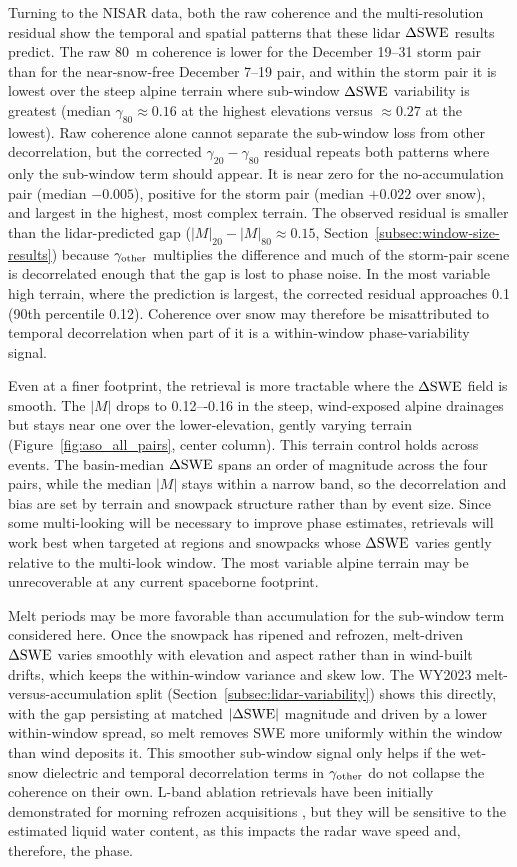 \documentclass[journal abbreviation, manuscript]{copernicus}
\begin{document}
Turning to the NISAR data, both the raw coherence and the multi-resolution residual show the temporal and spatial patterns that these lidar $\Delta\mathrm{SWE}$ results predict. The raw 80~m coherence is lower for the December 19--31 storm pair than for the near-snow-free December 7--19 pair, and within the storm pair it is lowest over the steep alpine terrain where sub-window $\Delta\mathrm{SWE}$ variability is greatest (median $\gamma_{80}\approx0.16$ at the highest elevations versus $\approx0.27$ at the lowest). Raw coherence alone cannot separate the sub-window loss from other decorrelation, but the corrected $\gamma_{20}-\gamma_{80}$ residual repeats both patterns where only the sub-window term should appear. It is near zero for the no-accumulation pair (median $-0.005$), positive for the storm pair (median $+0.022$ over snow), and largest in the highest, most complex terrain. The observed residual is smaller than the lidar-predicted gap ($|M|_{20}-|M|_{80}\approx0.15$, Section~\ref{subsec:window-size-results}) because $\gamma_{\rm other}$ multiplies the difference and much of the storm-pair scene is decorrelated enough that the gap is lost to phase noise. In the most variable high terrain, where the prediction is largest, the corrected residual approaches 0.1 (90th percentile 0.12). Coherence over snow may therefore be misattributed to temporal decorrelation when part of it is a within-window phase-variability signal.

Even at a finer footprint, the retrieval is more tractable where the $\Delta\mathrm{SWE}$ field is smooth. The $|M|$ drops to 0.12–-0.16 in the steep, wind-exposed alpine drainages but stays near one over the lower-elevation, gently varying terrain (Figure~\ref{fig:aso_all_pairs}, center column). This terrain control holds across events. The basin-median $\Delta\mathrm{SWE}$ spans an order of magnitude across the four pairs, while the median $|M|$ stays within a narrow band, so the decorrelation and bias are set by terrain and snowpack structure rather than by event size. Since some multi-looking will be necessary to improve phase estimates, retrievals will work best when targeted at regions and snowpacks whose $\Delta\mathrm{SWE}$ varies gently relative to the multi-look window. The most variable alpine terrain may be unrecoverable at any current spaceborne footprint.

Melt periods may be more favorable than accumulation for the sub-window term considered here. Once the snowpack has ripened and refrozen, melt-driven $\Delta\mathrm{SWE}$ varies smoothly with elevation and aspect rather than in wind-built drifts, which keeps the within-window variance and skew low. The WY2023 melt-versus-accumulation split (Section~\ref{subsec:lidar-variability}) shows this directly, with the gap persisting at matched $|\Delta\mathrm{SWE}|$ magnitude and driven by a lower within-window spread, so melt removes SWE more uniformly within the window than wind deposits it. This smoother sub-window signal only helps if the wet-snow dielectric and temporal decorrelation terms in $\gamma_{\rm other}$ do not collapse the coherence on their own. L-band ablation retrievals have been initially demonstrated for morning refrozen acquisitions \citep{Tarricone2023}, but they will be sensitive to the estimated liquid water content, as this impacts the radar wave speed and, therefore, the phase.
\end{document}
